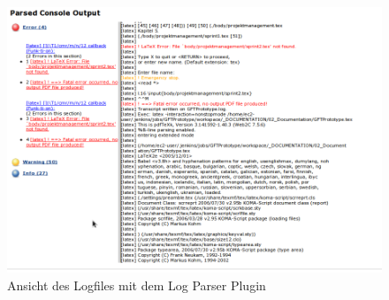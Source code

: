 \begin{figure}[!ht]
	\centering
	\includegraphics[width=\textwidth]{images/infrastruktur/jenkins-parsed-output}
	\caption{Ansicht des Logfiles mit dem Log Parser Plugin}
	\label{jenkins-parsed-output}
\end{figure}

